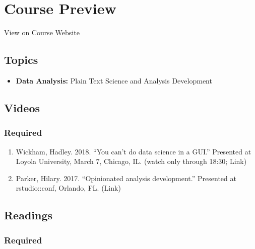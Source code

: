 \documentclass[]{book}
\providecommand{\tightlist}{%
  \setlength{\itemsep}{0pt}\setlength{\parskip}{0pt}}
\theoremstyle{definition}
\theoremstyle{definition}
\theoremstyle{definition}
\theoremstyle{remark}
\begin{document}
\hypertarget{course-preview}{%
\section*{Course Preview}\label{course-preview}}

View on Course Website

\hypertarget{topics}{%
\subsection*{Topics}\label{topics}}

\begin{itemize}
\tightlist
\item
  \textbf{Data Analysis:} Plain Text Science and Analysis Development
\end{itemize}

\hypertarget{videos}{%
\subsection*{Videos}\label{videos}}

\hypertarget{required}{%
\subsubsection*{Required}\label{required}}

\begin{enumerate}
\def\labelenumi{\arabic{enumi}.}
\tightlist
\item
  Wickham, Hadley. 2018. ``You can't do data science in a GUI.''
  Presented at Loyola University, March 7, Chicago, IL. (watch only
  through 18:30; Link)
\item
  Parker, Hilary. 2017. ``Opinionated analysis development.'' Presented
  at rstudio::conf, Orlando, FL. (Link)
\end{enumerate}

\hypertarget{readings-1}{%
\subsection*{Readings}\label{readings-1}}

\hypertarget{required-1}{%
\subsubsection*{Required}\label{required-1}}
\end{document}
